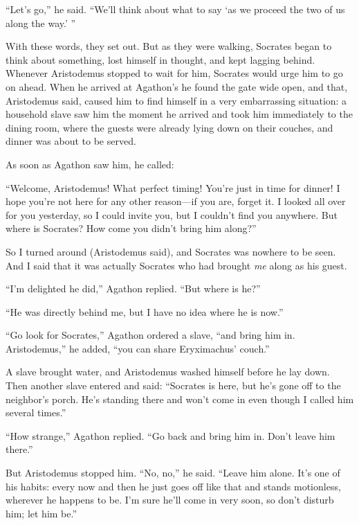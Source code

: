 “Let's go,” he said. “We'll think about what to say ‘as we proceed the
two of us along the way.'
”

With these words, they set out. But as they were walking, Socrates began
to think about something, lost himself in thought, and kept lagging
behind. Whenever Aristodemus stopped to wait for him, Socrates would
urge him  to go on ahead. When he arrived at Agathon's he found
the gate wide open, and that, Aristodemus said, caused him to find
himself in a very embarrassing situation: a household slave saw him the
moment he arrived and took him immediately to the dining room, where the
guests were already lying down on their couches, and dinner was about to
be served.

As soon as Agathon saw him, he called:

“Welcome, Aristodemus! What perfect timing! You're just in time for
dinner! I hope you're not here for any other reason---if you are, forget
it. I looked all over for you yesterday, so I could invite you, but I
couldn't find you anywhere. But where is Socrates? How come you didn't
bring him along?”

So I turned around (Aristodemus said), and Socrates was nowhere to be
seen. And I said that it was actually Socrates who had brought {\em me}
along as his guest.

“I'm delighted he did,” Agathon replied. “But where is
he?”

“He was directly behind me, but I have no idea where he is now.”

“Go look for Socrates,” Agathon ordered a slave, “and bring him in.
Aristodemus,” he added, “you can share Eryximachus' couch.”

A slave brought water, and Aristodemus washed himself before he lay
down. Then another slave entered and said: “Socrates is here, but he's
gone off to the neighbor's porch. He's standing there and won't come in
even though I called him several times.”

“How strange,” Agathon replied. “Go back and bring him in. Don't leave
him there.”

But Aristodemus stopped him. “No, no,” he said. “Leave him alone. It's 
one of his habits: every now and then he just goes off like that
and stands motionless, wherever he happens to be. I'm sure he'll come in
very soon, so don't disturb him; let him be.”

